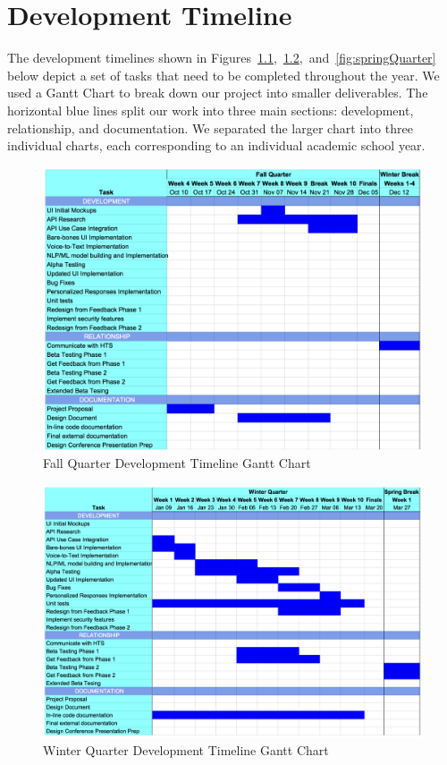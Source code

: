\chapter{Development Timeline}
The development timelines shown in Figures~\ref{fig:fallQuarter},~\ref{fig:winterQuarter},~and~\ref{fig:springQuarter} below depict a set of tasks that need to be completed throughout the year. We used a Gantt Chart to break down our project into smaller deliverables. The horizontal blue lines split our work into three main sections: development, relationship, and documentation. We separated the larger chart into three individual charts, each corresponding to an individual academic school year.

\begin{figure}[htb]
\centering
\includegraphics[width =\textwidth]{fallQuarter.png}
\caption{Fall Quarter Development Timeline Gantt Chart}
\label{fig:fallQuarter}
\end{figure}

\begin{figure}[htb]
\centering
\includegraphics[width =\textwidth]{winterQuarter.png}
\caption{Winter Quarter Development Timeline Gantt Chart}
\label{fig:winterQuarter}
\end{figure}

